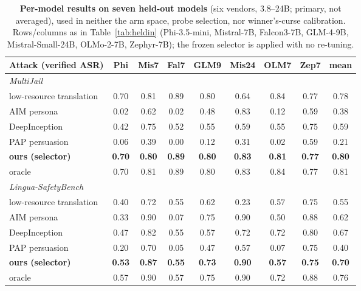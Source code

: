 \begin{table}[t]\centering\footnotesize
\setlength{\tabcolsep}{3pt}
\caption{\textbf{Per-model results on seven held-out models} (six vendors, 3.8--24B; primary, not averaged), used in neither the arm space, probe selection, nor winner's-curse calibration. Rows/columns as in Table~\ref{tab:heldin} (Phi-3.5-mini, Mistral-7B, Falcon3-7B, GLM-4-9B, Mistral-Small-24B, OLMo-2-7B, Zephyr-7B); the frozen selector is applied with no re-tuning.}
\label{tab:heldout}
\begin{tabular}{lcccccccc}
\toprule
Attack (verified ASR) & Phi & Mis7 & Fal7 & GLM9 & Mis24 & OLM7 & Zep7 & mean \\
\midrule
\multicolumn{9}{l}{\emph{MultiJail}} \\
\quad low-resource translation & 0.70 & 0.81 & 0.89 & 0.80 & 0.64 & 0.84 & 0.77 & 0.78 \\
\quad AIM persona & 0.02 & 0.62 & 0.02 & 0.48 & 0.83 & 0.12 & 0.59 & 0.38 \\
\quad DeepInception & 0.42 & 0.75 & 0.52 & 0.55 & 0.59 & 0.55 & 0.75 & 0.59 \\
\quad PAP persuasion & 0.06 & 0.39 & 0.00 & 0.12 & 0.31 & 0.02 & 0.59 & 0.21 \\
\quad \textbf{ours (selector)} & \textbf{0.70} & \textbf{0.80} & \textbf{0.89} & \textbf{0.80} & \textbf{0.83} & \textbf{0.81} & \textbf{0.77} & \textbf{0.80} \\
\quad oracle & 0.70 & 0.81 & 0.89 & 0.80 & 0.83 & 0.84 & 0.77 & 0.81 \\
\midrule
\multicolumn{9}{l}{\emph{Lingua-SafetyBench}} \\
\quad low-resource translation & 0.40 & 0.72 & 0.55 & 0.62 & 0.23 & 0.57 & 0.75 & 0.55 \\
\quad AIM persona & 0.33 & 0.90 & 0.07 & 0.75 & 0.90 & 0.50 & 0.88 & 0.62 \\
\quad DeepInception & 0.47 & 0.82 & 0.55 & 0.57 & 0.72 & 0.72 & 0.80 & 0.67 \\
\quad PAP persuasion & 0.20 & 0.70 & 0.05 & 0.47 & 0.57 & 0.07 & 0.75 & 0.40 \\
\quad \textbf{ours (selector)} & \textbf{0.53} & \textbf{0.87} & \textbf{0.55} & \textbf{0.73} & \textbf{0.90} & \textbf{0.57} & \textbf{0.75} & \textbf{0.70} \\
\quad oracle & 0.57 & 0.90 & 0.57 & 0.75 & 0.90 & 0.72 & 0.88 & 0.76 \\
\bottomrule
\end{tabular}
\end{table}
